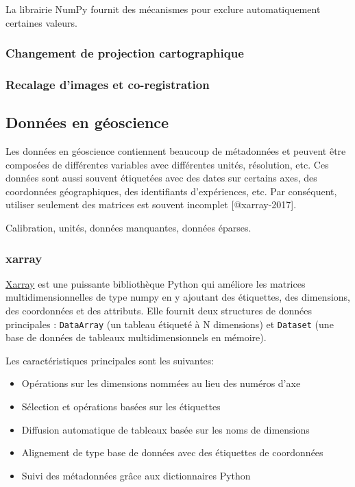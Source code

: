 \documentclass[11pt]{article}
\begin{document}
La librairie NumPy fournit des mécanismes pour exclure automatiquement
certaines valeurs.

\hypertarget{changement-de-projection-cartographique}{%
\subsubsection{Changement de projection
cartographique}\label{changement-de-projection-cartographique}}

\hypertarget{recalage-dimages-et-co-registration}{%
\subsubsection{Recalage d'images et
co-registration}\label{recalage-dimages-et-co-registration}}

\hypertarget{donnuxe9es-en-guxe9oscience}{%
\subsection{Données en géoscience}\label{donnuxe9es-en-guxe9oscience}}

Les données en géoscience contiennent beaucoup de métadonnées et peuvent
être composées de différentes variables avec différentes unités,
résolution, etc. Ces données sont aussi souvent étiquetées avec des
dates sur certains axes, des coordonnées géographiques, des identifiants
d'expériences, etc. Par conséquent, utiliser seulement des matrices est
souvent incomplet {[}@xarray-2017{]}.

Calibration, unités, données manquantes, données éparses.

\hypertarget{xarray}{%
\subsubsection{xarray}\label{xarray}}

\href{https://docs.xarray.dev/en/latest/getting-started-guide/why-xarray.html}{Xarray}
est une puissante bibliothèque Python qui améliore les matrices
multidimensionnelles de type numpy en y ajoutant des étiquettes, des
dimensions, des coordonnées et des attributs. Elle fournit deux
structures de données principales : \texttt{DataArray} (un tableau
étiqueté à N dimensions) et \texttt{Dataset} (une base de données de
tableaux multidimensionnels en mémoire).

Les caractéristiques principales sont les suivantes:

\begin{itemize}
\item
  Opérations sur les dimensions nommées au lieu des numéros d'axe
\item
  Sélection et opérations basées sur les étiquettes
\item
  Diffusion automatique de tableaux basée sur les noms de dimensions
\item
  Alignement de type base de données avec des étiquettes de coordonnées
\item
  Suivi des métadonnées grâce aux dictionnaires Python
\end{itemize}
\end{document}
